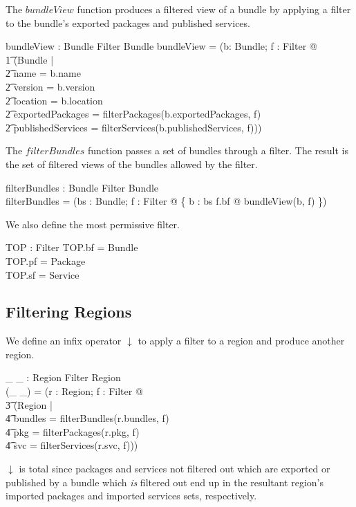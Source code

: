 \documentclass[a4paper,9pt]{article}
\begin{document}
The $bundleView$ function produces a filtered view of a bundle by applying a filter to the bundle's exported packages and published services.
\begin{axdef}
  bundleView : Bundle \cross Filter \fun Bundle
\where
  bundleView = (\lambda b: Bundle; f : Filter @ \\
\t1  (\mu Bundle | \\
\t2 name = b.name \land \\
\t2 version = b.version \land \\
\t2 location = b.location \land \\
\t2 exportedPackages = filterPackages(b.exportedPackages, f) \land \\
\t2 publishedServices = filterServices(b.publishedServices, f)))
\end{axdef}

The $filterBundles$ function passes a set of bundles through a filter.
The result is the set of filtered views of the bundles allowed by the filter.
\begin{axdef}
  filterBundles : \power Bundle \cross Filter \fun \power Bundle \\
\where
  filterBundles = (\lambda bs : \power Bundle; f : Filter @ \{ b : bs \cap f.bf @ bundleView(b, f) \}) \\
\end{axdef}

We also define the most permissive filter.
\begin{axdef}
  TOP : Filter
\where
  TOP.bf = Bundle \\
  TOP.pf = Package \\
  TOP.sf = Service \\
\end{axdef}

\subsection{Filtering Regions}

We define an infix operator $\downarrow$ to apply a filter to a region and produce another region.
\begin{axdef}
  \_ \downarrow \_ : Region \cross Filter \fun Region \\
\where
  (\_ \downarrow \_) = (\lambda r : Region;  f : Filter @ \\
\t3   (\mu Region | \\
\t4 bundles = filterBundles(r.bundles, f) \land \\
\t4 pkg = filterPackages(r.pkg, f) \land \\
\t4 svc = filterServices(r.svc, f))) \\
\end{axdef}
$\downarrow$ is total since packages and services not filtered out which are exported or published by a
bundle which \textit{is} filtered out end up
in the resultant region's imported packages and imported services sets, respectively.
\end{document}
